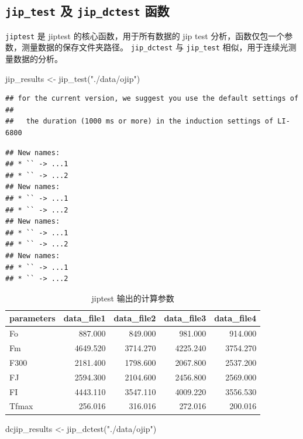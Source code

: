 \documentclass[
]{krantz}
\makeatletter
\newenvironment{Shaded}{\begin{snugshade}}{\end{snugshade}}
\newcommand{\FunctionTok}[1]{\textcolor[rgb]{0.00,0.00,0.00}{#1}}
\newcommand{\NormalTok}[1]{#1}
\newcommand{\OtherTok}[1]{\textcolor[rgb]{0.56,0.35,0.01}{#1}}
\newcommand{\StringTok}[1]{\textcolor[rgb]{0.31,0.60,0.02}{#1}}
\newenvironment{kframe}{%
\medskip{}
\setlength{\fboxsep}{.8em}
 \def\at@end@of@kframe{}%
 \ifinner\ifhmode%
  \def\at@end@of@kframe{\end{minipage}}%
  \begin{minipage}{\columnwidth}%
 \fi\fi%
 \def\FrameCommand##1{\hskip\@totalleftmargin \hskip-\fboxsep
 \colorbox{shadecolor}{##1}\hskip-\fboxsep
     \hskip-\linewidth \hskip-\@totalleftmargin \hskip\columnwidth}%
 \MakeFramed {\advance\hsize-\width
   \@totalleftmargin\z@ \linewidth\hsize
   \@setminipage}}%
 {\par\unskip\endMakeFramed%
 \at@end@of@kframe}
\renewenvironment{Shaded}{\begin{kframe}}{\end{kframe}}
\makeatother
\begin{document}
\hypertarget{testfluor}{%
\subsection{\texorpdfstring{\texttt{jip\_test} 及 \texttt{jip\_dctest} 函数}{jip\_test 及 jip\_dctest 函数}}\label{testfluor}}

\texttt{jiptest} 是 jiptest 的核心函数，用于所有数据的 jip test 分析，函数仅包一个参数，测量数据的保存文件夹路径。
\texttt{jip\_dctest} 与 \texttt{jip\_test} 相似，用于连续光测量数据的分析。

\begin{Shaded}
\begin{Highlighting}[]
\NormalTok{jip\_results }\OtherTok{\textless{}{-}} \FunctionTok{jip\_test}\NormalTok{(}\StringTok{"./data/ojip"}\NormalTok{)}
\end{Highlighting}
\end{Shaded}

\begin{verbatim}
## for the current version, we suggest you use the default settings of
## 
##   the duration (1000 ms or more) in the induction settings of LI-6800
\end{verbatim}

\begin{verbatim}
## New names:
## * `` -> ...1
## * `` -> ...2
## New names:
## * `` -> ...1
## * `` -> ...2
## New names:
## * `` -> ...1
## * `` -> ...2
## New names:
## * `` -> ...1
## * `` -> ...2
\end{verbatim}

\begin{longtable}[t]{lrrrr}
\caption{\label{tab:jipres}jiptest 输出的计算参数}\\
\toprule
parameters & data\_file1 & data\_file2 & data\_file3 & data\_file4\\
\midrule
Fo & 887.000 & 849.000 & 981.000 & 914.000\\
Fm & 4649.520 & 3714.270 & 4225.240 & 3754.270\\
F300 & 2181.400 & 1798.600 & 2067.800 & 2537.200\\
FJ & 2594.300 & 2104.600 & 2456.800 & 2569.000\\
FI & 4443.110 & 3547.110 & 4009.220 & 3556.530\\
\addlinespace
Tfmax & 256.016 & 316.016 & 272.016 & 200.016\\
\bottomrule
\end{longtable}

\begin{Shaded}
\begin{Highlighting}[]
\NormalTok{dcjip\_results }\OtherTok{\textless{}{-}} \FunctionTok{jip\_dctest}\NormalTok{(}\StringTok{"./data/ojip"}\NormalTok{)}
\end{Highlighting}
\end{Shaded}
\end{document}
